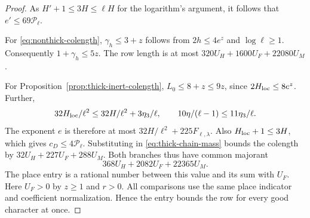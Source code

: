 \begin{proof}
As \(H'+1\le3H\le\ell H\) for the logarithm's argument, it follows
that \(e'\le69\mathcal P_\ell\).

For \eqref{eq:nonthick-colength}, \(\gamma_h\le3+z\) follows from
\(2h\le4e^z\) and \(\log\ell\ge1\).
Consequently \(1+\gamma_h\le5z\). The row length is at most
\(320U_H+1600U_F+22080U_M\).

For Proposition~\ref{prop:thick-inert-colength},
\(L_0\le8+z\le9z\), since
\(2H_{\rm loc}\le8e^z\). Further,
\[
 32H_{\rm loc}/\ell^2\le32H/\ell^2+3\eta_3/\ell,\qquad
 10\eta/(\ell-1)\le11\eta_3/\ell .
\]
The exponent \(e\) is therefore at most
\(32H/\ell^2+225F_{\ell,\lambda}\).
Also \(H_{\rm loc}+1\le3H\), which gives
\(c_D\le4\mathcal P_\ell\).
Substituting in \eqref{eq:thick-chain-mass} bounds the colength
by \(32U_H+227U_F+288U_M\).
Both branches thus have common majorant
\[
                       368U_H+2082U_F+22365U_M .
\]
The place entry is a rational number between this value and its
sum with \(U_F\). Here \(U_F>0\) by \(z\ge1\) and \(r>0\).
All comparisons use the same place indicator and coefficient
normalization. Hence the entry bounds the row for every
good character at once.
\end{proof}

